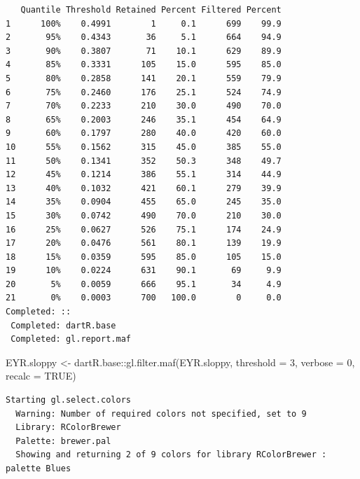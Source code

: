 \documentclass[
  letterpaper,
  DIV=11,
  numbers=noendperiod]{scrreprt}
\newenvironment{Shaded}{\begin{snugshade}}{\end{snugshade}}
\newcommand{\AttributeTok}[1]{\textcolor[rgb]{0.49,0.56,0.16}{#1}}
\newcommand{\ConstantTok}[1]{\textcolor[rgb]{0.53,0.00,0.00}{#1}}
\newcommand{\DecValTok}[1]{\textcolor[rgb]{0.25,0.63,0.44}{#1}}
\newcommand{\FunctionTok}[1]{\textcolor[rgb]{0.02,0.16,0.49}{#1}}
\newcommand{\NormalTok}[1]{\textcolor[rgb]{0.00,0.44,0.13}{#1}}
\newcommand{\OtherTok}[1]{\textcolor[rgb]{0.00,0.44,0.13}{#1}}
\newcommand{\SpecialCharTok}[1]{\textcolor[rgb]{0.25,0.44,0.63}{#1}}
\let\textttOrig\texttt
\renewcommand{\texttt}[1]{\textttOrig{\color{blue}{#1}}}
\begin{document}
\begin{figure}[H]

{\centering \texttt{[image: Session10\_SexLinkedMarkers\_files/figure-pdf/unnamed-chunk-13-5.pdf]}

}

\end{figure}

\begin{verbatim}
   Quantile Threshold Retained Percent Filtered Percent
1      100%    0.4991        1     0.1      699    99.9
2       95%    0.4343       36     5.1      664    94.9
3       90%    0.3807       71    10.1      629    89.9
4       85%    0.3331      105    15.0      595    85.0
5       80%    0.2858      141    20.1      559    79.9
6       75%    0.2460      176    25.1      524    74.9
7       70%    0.2233      210    30.0      490    70.0
8       65%    0.2003      246    35.1      454    64.9
9       60%    0.1797      280    40.0      420    60.0
10      55%    0.1562      315    45.0      385    55.0
11      50%    0.1341      352    50.3      348    49.7
12      45%    0.1214      386    55.1      314    44.9
13      40%    0.1032      421    60.1      279    39.9
14      35%    0.0904      455    65.0      245    35.0
15      30%    0.0742      490    70.0      210    30.0
16      25%    0.0627      526    75.1      174    24.9
17      20%    0.0476      561    80.1      139    19.9
18      15%    0.0359      595    85.0      105    15.0
19      10%    0.0224      631    90.1       69     9.9
20       5%    0.0059      666    95.1       34     4.9
21       0%    0.0003      700   100.0        0     0.0
Completed: :: 
 Completed: dartR.base 
 Completed: gl.report.maf 
\end{verbatim}

\begin{Shaded}
\begin{Highlighting}[]
\NormalTok{EYR.sloppy }\OtherTok{\textless{}{-}}\NormalTok{ dartR.base}\SpecialCharTok{::}\FunctionTok{gl.filter.maf}\NormalTok{(EYR.sloppy, }\AttributeTok{threshold =} \DecValTok{3}\NormalTok{, }\AttributeTok{verbose =} \DecValTok{0}\NormalTok{,}
    \AttributeTok{recalc =} \ConstantTok{TRUE}\NormalTok{)}
\end{Highlighting}
\end{Shaded}

\begin{verbatim}
Starting gl.select.colors 
  Warning: Number of required colors not specified, set to 9
  Library: RColorBrewer
  Palette: brewer.pal
  Showing and returning 2 of 9 colors for library RColorBrewer : palette Blues 
\end{verbatim}
\end{document}
